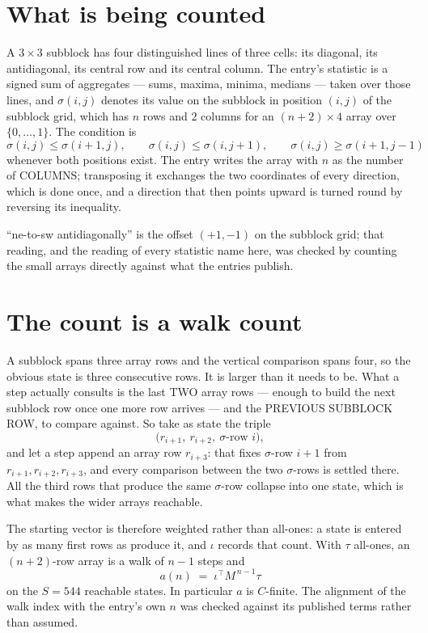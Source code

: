 \documentclass[11pt,a4paper]{article}
\theoremstyle{plain}
\theoremstyle{definition}
\begin{document}
\section{What is being counted}

A $3\times3$ subblock has four distinguished lines of three cells: its diagonal, its
antidiagonal, its central row and its central column. The entry's statistic is a signed sum of
aggregates --- sums, maxima, minima, medians --- taken over those lines, and $\sigma(i,j)$
denotes its value on the subblock in position $(i,j)$ of the subblock grid, which has $n$ rows
and $2$ columns for an $(n+2)\times4$ array over $\{0,\dots,1\}$. The condition is
\[
\sigma(i,j)\le\sigma(i+1,j),\qquad \sigma(i,j)\le\sigma(i,j+1),\qquad \sigma(i,j)\ge\sigma(i+1,j-1)
\]
whenever both positions exist. The entry writes the array with $n$ as the number of COLUMNS; transposing it exchanges the two coordinates of every direction, which is done once, and a direction that then points upward is turned round by reversing its inequality.

``ne-to-sw antidiagonally'' is the offset $(+1,-1)$ on the subblock grid; that reading, and
the reading of every statistic name here, was checked by counting the small arrays directly
against what the entries publish.

\section{The count is a walk count}

A subblock spans three array rows and the vertical comparison spans four, so the obvious state
is three consecutive rows. It is larger than it needs to be. What a step actually consults is
the last TWO array rows --- enough to build the next subblock row once one more row arrives ---
and the PREVIOUS SUBBLOCK ROW, to compare against. So take as state the triple
\[
\bigl(r_{i+1},\ r_{i+2},\ \sigma\text{-row }i\bigr),
\]
and let a step append an array row $r_{i+3}$: that fixes $\sigma$-row $i+1$ from
$r_{i+1},r_{i+2},r_{i+3}$, and every comparison between the two $\sigma$-rows is settled
there. All the third rows that produce the same $\sigma$-row collapse into one state, which is
what makes the wider arrays reachable.

The starting vector is therefore weighted rather than all-ones: a state is entered by as many
first rows as produce it, and $\iota$ records that count. With $\tau$ all-ones, an
$(n+2)$-row array is a walk of $n-1$ steps and
\[
a(n)\;=\;\iota^{\!\top}M^{\,n-1}\tau
\]
on the $S=544$ reachable states. In particular $a$ is $C$-finite. The alignment of the walk
index with the entry's own $n$ was checked against its published terms rather than assumed.
\end{document}
